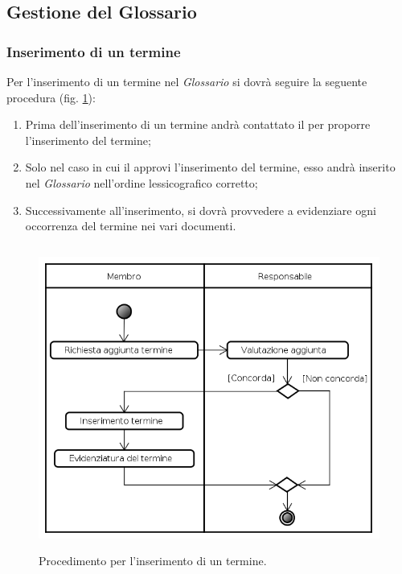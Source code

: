\subsection{Gestione del Glossario}
\label{gestione_gloss}

\subsubsection{Inserimento di un termine}
\label{inserimento_termine}
Per l'inserimento di un termine nel \emph{Glossario} si dovrà seguire la seguente procedura (fig. \ref{diagramma_add}):
\begin{enumerate}
\item Prima dell'inserimento di un termine andrà contattato il \projectManager{} per proporre l'inserimento del termine;
\item Solo nel caso in cui il \projectManager{} approvi l'inserimento del termine, esso andrà inserito nel \emph{Glossario} nell'ordine lessicografico corretto;
\item Successivamente all'inserimento, si dovrà provvedere a evidenziare ogni occorrenza del termine nei vari documenti.
\end{enumerate}
\pagebreak
\begin{figure}[!h]
 \centering
 \includegraphics[height=10cm] {./content/Immagini/Aggiunta_Termine.png}
 \caption{Procedimento per l'inserimento di un termine.}
 \label{diagramma_add}
 \end{figure}


